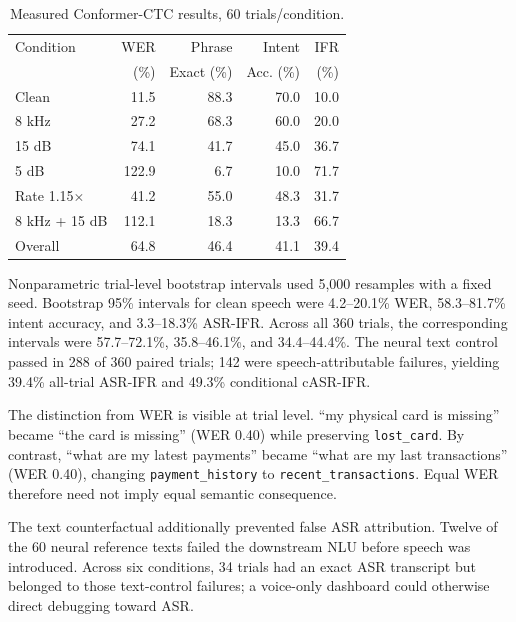 \documentclass[conference]{IEEEtran}
\begin{document}
\begin{table}[t]
\caption{Measured Conformer-CTC results, 60 trials/condition.}
\label{tab:neural}
\centering\scriptsize
\begin{tabular}{lrrrr}
\toprule
Condition & WER & Phrase & Intent & IFR\\
 & (\%) & Exact (\%) & Acc. (\%) & (\%)\\
\midrule
Clean & 11.5 & 88.3 & 70.0 & 10.0\\
8 kHz & 27.2 & 68.3 & 60.0 & 20.0\\
15 dB & 74.1 & 41.7 & 45.0 & 36.7\\
5 dB & 122.9 & 6.7 & 10.0 & 71.7\\
Rate 1.15$\times$ & 41.2 & 55.0 & 48.3 & 31.7\\
8 kHz + 15 dB & 112.1 & 18.3 & 13.3 & 66.7\\
\midrule
Overall & 64.8 & 46.4 & 41.1 & 39.4\\
\bottomrule
\end{tabular}
\end{table}

Nonparametric trial-level bootstrap intervals used 5,000 resamples with a fixed seed. Bootstrap 95\% intervals for clean speech were 4.2--20.1\% WER, 58.3--81.7\% intent accuracy, and 3.3--18.3\% ASR-IFR. Across all 360 trials, the corresponding intervals were 57.7--72.1\%, 35.8--46.1\%, and 34.4--44.4\%. The neural text control passed in 288 of 360 paired trials; 142 were speech-attributable failures, yielding 39.4\% all-trial ASR-IFR and 49.3\% conditional cASR-IFR.

The distinction from WER is visible at trial level. ``my physical card is missing'' became ``the card is missing'' (WER 0.40) while preserving \texttt{lost\_card}. By contrast, ``what are my latest payments'' became ``what are my last transactions'' (WER 0.40), changing \texttt{payment\_history} to \texttt{recent\_transactions}. Equal WER therefore need not imply equal semantic consequence.

The text counterfactual additionally prevented false ASR attribution. Twelve of the 60 neural reference texts failed the downstream NLU before speech was introduced. Across six conditions, 34 trials had an exact ASR transcript but belonged to those text-control failures; a voice-only dashboard could otherwise direct debugging toward ASR.
\end{document}
